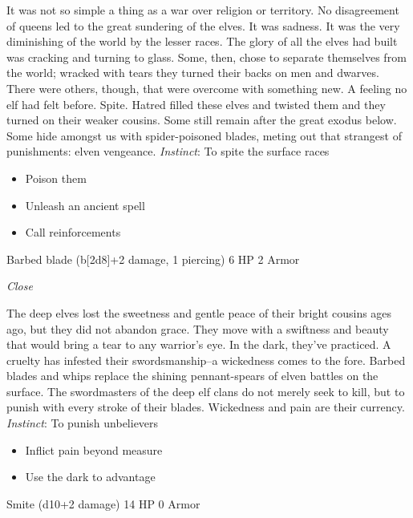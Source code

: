 \HRule
It was not so simple a thing as a war over religion or territory. No disagreement of queens led to the great sundering of the elves. It was sadness. It was the very diminishing of the world by the lesser races. The glory of all the elves had built was cracking and turning to glass. Some, then, chose to separate themselves from the world; wracked with tears they turned their backs on men and dwarves. There were others, though, that were overcome with something new. A feeling no elf had felt before. Spite. Hatred filled these elves and twisted them and they turned on their weaker cousins. Some still remain after the great exodus below. Some hide amongst us with spider-poisoned blades, meting out that strangest of punishments: elven vengeance. \emph{Instinct}: To spite the surface races
\begin{itemize}
\item Poison them
\item Unleash an ancient spell
\item Call reinforcements
\end{itemize}
\newpage
\HRule
{}

Barbed blade (b[2d8]+2 damage, 1 piercing)\hspace*{\fill} 6 HP 2 Armor

\emph{Close}

\HRule
The deep elves lost the sweetness and gentle peace of their bright cousins ages ago, but they did not abandon grace. They move with a swiftness and beauty that would bring a tear to any warrior's eye. In the dark, they've practiced. A cruelty has infested their swordsmanship--a wickedness comes to the fore. Barbed blades and whips replace the shining pennant-spears of elven battles on the surface. The swordmasters of the deep elf clans do not merely seek to kill, but to punish with every stroke of their blades. Wickedness and pain are their currency. \emph{Instinct}: To punish unbelievers
\begin{itemize}
\item Inflict pain beyond measure
\item Use the dark to advantage
\end{itemize}

\HRule
{}

Smite (d10+2 damage)\hspace*{\fill} 14 HP 0 Armor

